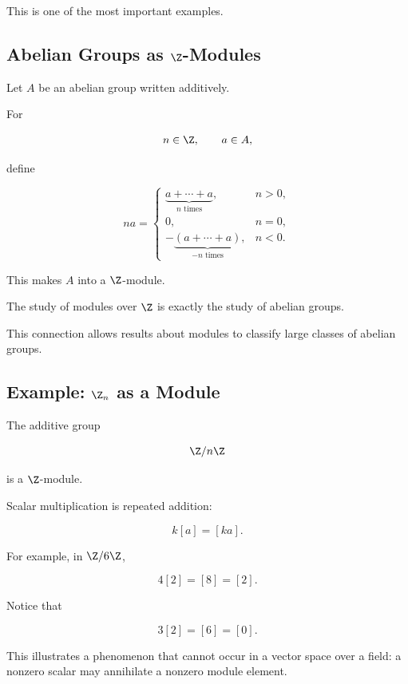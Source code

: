This is one of the most important examples.

\subsection{Abelian Groups as \(\Z\)-Modules}
\label{subsec:abelian-groups-z-modules}

Let \(A\) be an abelian group written additively.

For

\[ n\in\Z,\qquad a\in A, \]

define

\[
na=
\begin{cases}
\underbrace{a+\cdots+a}_{n\text{ times}}, & n>0,\\
0, & n=0,\\
-\underbrace{(a+\cdots+a)}_{-n\text{ times}}, & n<0.
\end{cases}
\]

This makes \(A\) into a \(\Z\)-module.

\begin{importantbox}
The study of modules over \(\Z\) is exactly the study of abelian groups.
\end{importantbox}

This connection allows results about modules to classify large classes of
abelian groups.

\subsection{Example: \(\Z_n\) as a Module}
\label{subsec:zn-module}

The additive group

\[ \Z/n\Z \]

is a \(\Z\)-module.

Scalar multiplication is repeated addition:

\[ k[a]=[ka]. \]

For example, in \(\Z/6\Z\),

\[ 4[2]=[8]=[2]. \]

Notice that

\[ 3[2]=[6]=[0]. \]

This illustrates a phenomenon that cannot occur in a vector space over a
field: a nonzero scalar may annihilate a nonzero module element.

